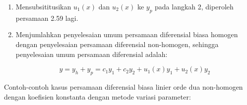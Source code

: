 \begin{enumerate}[1.]
	\item Mensubsititusikan \begin{math} u_1 (x) \end{math} dan \begin{math} u_2 (x) \end{math} ke \begin{math} y_p \end{math} pada langkah 2, diperoleh persamaan 2.59 lagi.

	\item Menjumlahkan penyelesaian umum persamaan diferensial biasa homogen dengan penyelesaian persamaan diferensial non-homogen, sehingga penyelesaian umum persamaan diferensial adalah:

	\begin{equation} y = y_h + y_p = c_1 y_1 + c_2 y_2 + u_1 (x) y_1 + u_2 (x) y_2 \end{equation}
	
\end{enumerate}

Contoh-contoh kasus persamaan diferensial biasa linier orde dua non-homogen dengan koefisien konstanta dengan metode variasi parameter:

